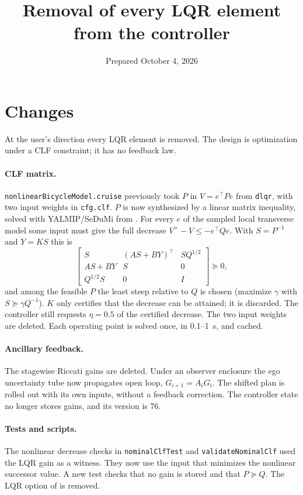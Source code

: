 \documentclass[11pt]{article}
\title{Removal of every LQR element from the controller}
\date{Prepared October 4, 2026}
\begin{document}
\maketitle

\section{Changes}
At the user's direction every LQR element is removed. The design is
optimization under a CLF constraint; it has no feedback law.

\paragraph{CLF matrix.} \texttt{nonlinearBicycleModel.cruise} previously took
$P$ in $V=e^\top Pe$ from \texttt{dlqr}, with two input weights in
\texttt{cfg.clf}. $P$ is now synthesized by a linear matrix inequality, solved
with YALMIP/SeDuMi from . For every $e$ of the sampled local
transverse model some input must give the full decrease
$V^+-V\le-e^\top Qe$. With $S=P^{-1}$ and $Y=KS$ this is
\[
\begin{bmatrix}S&(AS+BY)^\top&SQ^{1/2}\\AS+BY&S&0\\Q^{1/2}S&0&I\end{bmatrix}\succeq0,
\]
and among the feasible $P$ the least steep relative to $Q$ is chosen
(maximize $\gamma$ with $S\succeq\gamma Q^{-1}$). $K$ only certifies that the
decrease can be attained; it is discarded. The controller still requests
$\eta=0.5$ of the certified decrease. The two input weights are deleted. Each
operating point is solved once, in 0.1--1~s, and cached.

\paragraph{Ancillary feedback.} The stagewise Riccati gains are deleted. Under
an observer enclosure the ego uncertainty tube now propagates open loop,
$G_{i+1}=A_iG_i$. The shifted plan is rolled out with its own inputs, without a
feedback correction. The controller state no longer stores gains, and its
version is 76.

\paragraph{Tests and scripts.} The nonlinear decrease checks in
\texttt{nominalClfTest} and \texttt{validateNominalClf} used the LQR gain as a
witness. They now use the input that minimizes the nonlinear successor value. A
new test checks that no gain is stored and that $P\succeq Q$. The LQR option of
 is removed.
\end{document}
